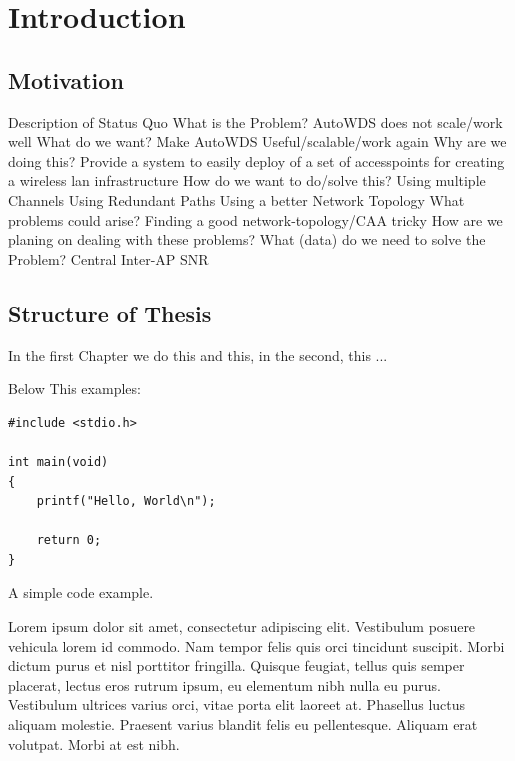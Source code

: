 \chapter{Introduction}
\section{Motivation}
Description of Status Quo\newline
What is the Problem? AutoWDS does not scale/work well \newline
What do we want? Make AutoWDS Useful/scalable/work again \newline
Why are we doing this? Provide a system to easily deploy of a set of accesspoints for creating a wireless lan infrastructure \newline
How do we want to do/solve this? Using multiple Channels \newline
Using Redundant Paths Using a better Network Topology \newline
What problems could arise? Finding a good network-topology/CAA tricky \newline
How are we planing on dealing with these problems? \newline
What (data) do we need to solve the Problem? Central Inter-AP SNR \newline

\section{Structure of Thesis}
In the first Chapter we do this and this, in the second, this ...

Below This examples:

\begin{listing}[t]
\begin{lstlisting}
#include <stdio.h>

int main(void)
{
	printf("Hello, World\n");

	return 0;
}
\end{lstlisting}
\caption{A simple code example.}
\label{lst:example}
\end{listing}

Lorem ipsum dolor sit amet, consectetur adipiscing elit. Vestibulum posuere vehicula lorem id commodo. Nam tempor felis quis orci tincidunt suscipit. Morbi dictum purus et nisl porttitor fringilla. Quisque feugiat, tellus quis semper placerat, lectus eros rutrum ipsum, eu elementum nibh nulla eu purus. Vestibulum ultrices varius orci, vitae porta elit laoreet at. Phasellus luctus aliquam molestie. Praesent varius blandit felis eu pellentesque. Aliquam erat volutpat. Morbi at est nibh.

